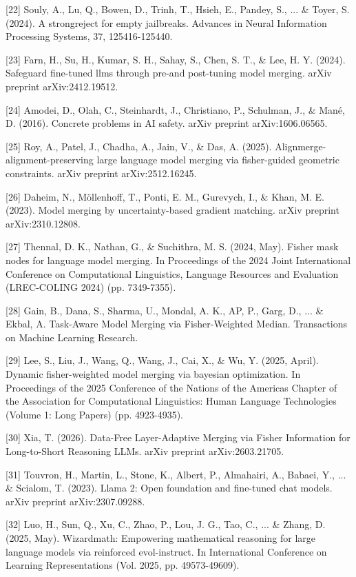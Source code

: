 \documentclass{article}
\begin{document}
{[22] Souly, A., Lu, Q., Bowen, D., Trinh, T., Hsieh, E., Pandey, S., ... \& Toyer, S. (2024). A strongreject for empty jailbreaks. Advances in Neural Information Processing Systems, 37, 125416-125440.

[23] Farn, H., Su, H., Kumar, S. H., Sahay, S., Chen, S. T., \& Lee, H. Y. (2024). Safeguard fine-tuned llms through pre-and post-tuning model merging. arXiv preprint arXiv:2412.19512.

[24] Amodei, D., Olah, C., Steinhardt, J., Christiano, P., Schulman, J., \& Mané, D. (2016). Concrete problems in AI safety. arXiv preprint arXiv:1606.06565.

[25] Roy, A., Patel, J., Chadha, A., Jain, V., \& Das, A. (2025). Alignmerge-alignment-preserving large language model merging via fisher-guided geometric constraints. arXiv preprint arXiv:2512.16245.

[26] Daheim, N., Möllenhoff, T., Ponti, E. M., Gurevych, I., \& Khan, M. E. (2023). Model merging by uncertainty-based gradient matching. arXiv preprint arXiv:2310.12808.

[27] Thennal, D. K., Nathan, G., \& Suchithra, M. S. (2024, May). Fisher mask nodes for language model merging. In Proceedings of the 2024 Joint International Conference on Computational Linguistics, Language Resources and Evaluation (LREC-COLING 2024) (pp. 7349-7355).

[28] Gain, B., Dana, S., Sharma, U., Mondal, A. K., AP, P., Garg, D., ... \& Ekbal, A. Task-Aware Model Merging via Fisher-Weighted Median. Transactions on Machine Learning Research.

[29] Lee, S., Liu, J., Wang, Q., Wang, J., Cai, X., \& Wu, Y. (2025, April). Dynamic fisher-weighted model merging via bayesian optimization. In Proceedings of the 2025 Conference of the Nations of the Americas Chapter of the Association for Computational Linguistics: Human Language Technologies (Volume 1: Long Papers) (pp. 4923-4935).

[30] Xia, T. (2026). Data-Free Layer-Adaptive Merging via Fisher Information for Long-to-Short Reasoning LLMs. arXiv preprint arXiv:2603.21705.

[31] Touvron, H., Martin, L., Stone, K., Albert, P., Almahairi, A., Babaei, Y., ... \& Scialom, T. (2023). Llama 2: Open foundation and fine-tuned chat models. arXiv preprint arXiv:2307.09288.

[32] Luo, H., Sun, Q., Xu, C., Zhao, P., Lou, J. G., Tao, C., ... \& Zhang, D. (2025, May). Wizardmath: Empowering mathematical reasoning for large language models via reinforced evol-instruct. In International Conference on Learning Representations (Vol. 2025, pp. 49573-49609).

}
\end{document}
